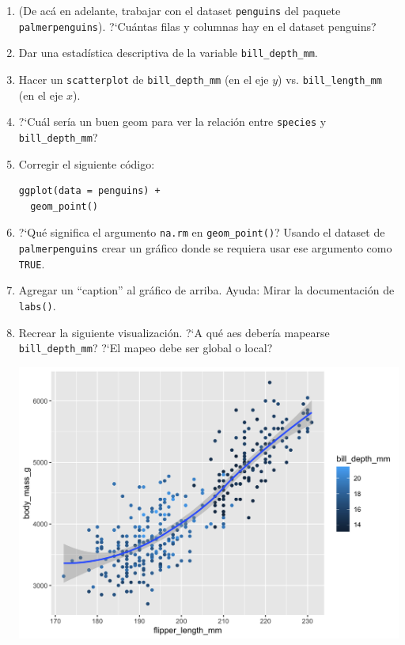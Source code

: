 \documentclass[a4paper,11pt]{article}
\theoremstyle{definition}
\begin{document}
\begin{enumerate}[resume]
\item (De ac\'a en adelante, trabajar con el dataset \lstinline{penguins} del paquete \lstinline{palmerpenguins}).
?`Cu\'antas
filas y
columnas hay en el dataset penguins?

\item  Dar una estad\'istica descriptiva de la variable \lstinline{bill_depth_mm}.

\item Hacer un \lstinline{scatterplot} de \lstinline{bill_depth_mm} (en el eje $y$) vs. \lstinline{bill_length_mm} (en el eje $x$).

\item ?`Cu\'al ser\'ia un buen geom para ver la relaci\'on entre \lstinline{species} y \lstinline{bill_depth_mm}?

\item Corregir el siguiente c\'odigo:
\begin{lstlisting}
ggplot(data = penguins) +
  geom_point()
\end{lstlisting}

\item ?`Qu\'e significa el argumento \lstinline{na.rm} en \lstinline{geom_point()}? Usando el dataset de \lstinline{palmerpenguins} crear un gr\'afico donde se requiera usar ese argumento como \lstinline{TRUE}.

\item Agregar un ``caption'' al gr\'afico de arriba. Ayuda: Mirar la documentaci\'on de \lstinline{labs()}.

\item Recrear la siguiente visualizaci\'on. ?`A qu\'e aes deber\'ia mapearse \lstinline{bill_depth_mm}? ?`El mapeo debe ser global o local?
\begin{center}
\includegraphics[scale=0.3]{practica3-img-penguins-mass.png}
\end{center}


\end{enumerate}
\end{document}
